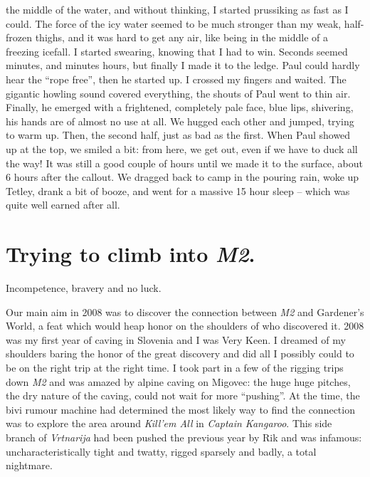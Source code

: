 the middle of the water, and without thinking, I started prussiking as
fast as I could. The force of the icy water seemed to be much stronger
than my weak, half-frozen thighs, and it was hard to get any air, like
being in the middle of a freezing icefall. I started swearing, knowing
that I had to win. Seconds seemed minutes, and minutes hours, but
finally I made it to the ledge. Paul could hardly hear the ``rope
free'', then he started up. I crossed my fingers and waited. The
gigantic howling sound covered everything, the shouts of Paul went to
thin air. Finally, he emerged with a frightened, completely pale face,
blue lips, shivering, his hands are of almost no use at all. We hugged
each other and jumped, trying to warm up. Then, the second half, just as
bad as the first. When Paul showed up at the top, we smiled a bit: from
here, we get out, even if we have to duck all the way! It was still a
good couple of hours until we made it to the surface, about 6 hours
after the callout. We dragged back to camp in the pouring rain, woke up
Tetley, drank a bit of booze, and went for a massive 15 hour sleep --
which was quite well earned after all.


\hypertarget{trying-to-climb-into-m2.}{%
\section{\texorpdfstring{Trying to climb into
\emph{M2}.}{Trying to climb into M2.}}\label{trying-to-climb-into-m2.}}

Incompetence, bravery and no luck.

Our main aim in 2008 was to discover the connection between \emph{M2}
and Gardener's World, a feat which would heap honor on the shoulders of
who discovered it. 2008 was my first year of caving in Slovenia and I
was Very Keen. I dreamed of my shoulders baring the honor of the great
discovery and did all I possibly could to be on the right trip at the
right time. I took part in a few of the rigging trips down \emph{M2} and
was amazed by alpine caving on Migovec: the huge huge pitches, the dry
nature of the caving, could not wait for more ``pushing''. At the time,
the bivi rumour machine had determined the most likely way to find the
connection was to explore the area around \emph{Kill'em All} in
\emph{Captain Kangaroo}. This side branch of \emph{Vrtnarija} had been
pushed the previous year by Rik and was infamous: uncharacteristically
tight and twatty, rigged sparsely and badly, a total nightmare.


